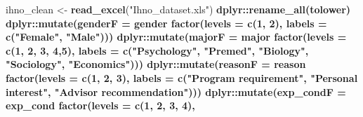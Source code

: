 \documentclass[
]{article}
\newenvironment{Shaded}{\begin{snugshade}}{\end{snugshade}}
\newcommand{\DataTypeTok}[1]{\textcolor[rgb]{0.13,0.29,0.53}{#1}}
\newcommand{\DecValTok}[1]{\textcolor[rgb]{0.00,0.00,0.81}{#1}}
\newcommand{\KeywordTok}[1]{\textcolor[rgb]{0.13,0.29,0.53}{\textbf{#1}}}
\newcommand{\NormalTok}[1]{#1}
\newcommand{\OperatorTok}[1]{\textcolor[rgb]{0.81,0.36,0.00}{\textbf{#1}}}
\newcommand{\StringTok}[1]{\textcolor[rgb]{0.31,0.60,0.02}{#1}}
\begin{document}
\begin{Shaded}
\begin{Highlighting}[]
\NormalTok{ihno_clean <-}\StringTok{ }\KeywordTok{read_excel}\NormalTok{(}\StringTok{"Ihno_dataset.xls"}\NormalTok{) }\OperatorTok{%
\StringTok{  }\NormalTok{dplyr}\OperatorTok{::}\KeywordTok{rename_all}\NormalTok{(tolower) }\OperatorTok{%
\StringTok{  }\NormalTok{dplyr}\OperatorTok{::}\KeywordTok{mutate}\NormalTok{(}\DataTypeTok{genderF =}\NormalTok{ gender }\OperatorTok{%
\StringTok{                  }\KeywordTok{factor}\NormalTok{(}\DataTypeTok{levels =} \KeywordTok{c}\NormalTok{(}\DecValTok{1}\NormalTok{, }\DecValTok{2}\NormalTok{),}
                         \DataTypeTok{labels =} \KeywordTok{c}\NormalTok{(}\StringTok{"Female"}\NormalTok{, }
                                    \StringTok{"Male"}\NormalTok{))) }\OperatorTok{%
\StringTok{  }\NormalTok{dplyr}\OperatorTok{::}\KeywordTok{mutate}\NormalTok{(}\DataTypeTok{majorF =}\NormalTok{ major }\OperatorTok{%
\StringTok{                  }\KeywordTok{factor}\NormalTok{(}\DataTypeTok{levels =} \KeywordTok{c}\NormalTok{(}\DecValTok{1}\NormalTok{, }\DecValTok{2}\NormalTok{, }\DecValTok{3}\NormalTok{, }\DecValTok{4}\NormalTok{,}\DecValTok{5}\NormalTok{),}
                         \DataTypeTok{labels =} \KeywordTok{c}\NormalTok{(}\StringTok{"Psychology"}\NormalTok{,}
                                    \StringTok{"Premed"}\NormalTok{,}
                                    \StringTok{"Biology"}\NormalTok{,}
                                    \StringTok{"Sociology"}\NormalTok{,}
                                    \StringTok{"Economics"}\NormalTok{))) }\OperatorTok{%
\StringTok{  }\NormalTok{dplyr}\OperatorTok{::}\KeywordTok{mutate}\NormalTok{(}\DataTypeTok{reasonF =}\NormalTok{ reason }\OperatorTok{%
\StringTok{                  }\KeywordTok{factor}\NormalTok{(}\DataTypeTok{levels =} \KeywordTok{c}\NormalTok{(}\DecValTok{1}\NormalTok{, }\DecValTok{2}\NormalTok{, }\DecValTok{3}\NormalTok{),}
                         \DataTypeTok{labels =} \KeywordTok{c}\NormalTok{(}\StringTok{"Program requirement"}\NormalTok{,}
                                    \StringTok{"Personal interest"}\NormalTok{,}
                                    \StringTok{"Advisor recommendation"}\NormalTok{))) }\OperatorTok{%
\StringTok{  }\NormalTok{dplyr}\OperatorTok{::}\KeywordTok{mutate}\NormalTok{(}\DataTypeTok{exp_condF =}\NormalTok{ exp_cond }\OperatorTok{%
\StringTok{                  }\KeywordTok{factor}\NormalTok{(}\DataTypeTok{levels =} \KeywordTok{c}\NormalTok{(}\DecValTok{1}\NormalTok{, }\DecValTok{2}\NormalTok{, }\DecValTok{3}\NormalTok{, }\DecValTok{4}\NormalTok{),}
}}}}}}}}}
\end{Highlighting}
\end{Shaded}
\end{document}
